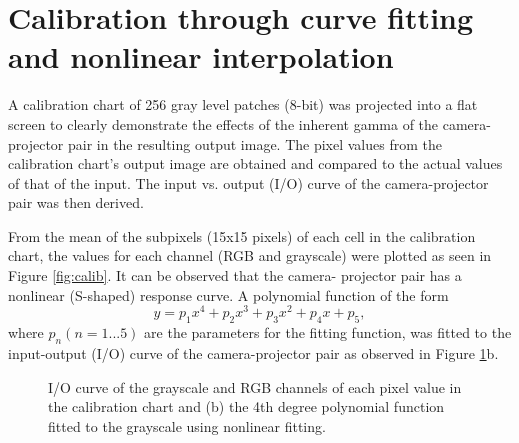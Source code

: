 \section{Calibration through curve fitting and nonlinear interpolation}

A calibration chart of 256 gray level patches (8-bit) was projected into a flat screen to clearly demonstrate the effects of the inherent gamma of the camera-projector pair in the resulting output image. 
The pixel values from the calibration chart's output image are obtained and compared to the actual values of that of the input. 
The input vs. output (I/O) curve of the camera-projector pair was then derived.
 
From the mean of the subpixels (15x15 pixels) of each cell in the calibration chart, the values for each channel (RGB and grayscale) were plotted as seen in Figure \ref{fig:calib}. It can be observed that the camera-
projector pair has a nonlinear (S-shaped) response curve. A polynomial function of the form
\begin{equation}
y = p_1x^4 + p_2x^3 + p_3x^2 + p_4x + p_5,
\label{eq:poly}
\end{equation}
where $p_n (n = 1...5)$ are the parameters for the fitting function, was fitted to the input-output (I/O) curve of the camera-projector pair as observed in Figure \ref{fig:IO_fit}b. 

\captionsetup[figure]{width=5in}
\begin{figure}[h!t]
	\centering
	\caption{ I/O curve of the grayscale and RGB channels of each pixel value in the calibration chart and (b) the 4th degree polynomial function fitted to the grayscale using nonlinear fitting.}
	\label{fig:IO_fit}
\end{figure}



